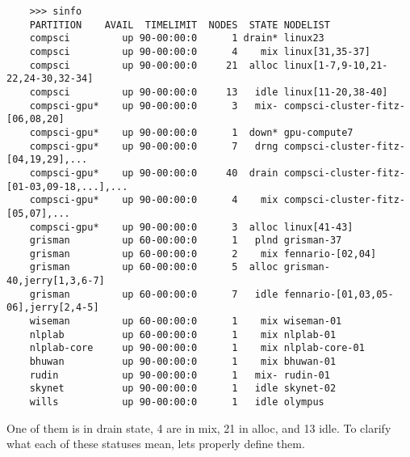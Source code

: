   \begin{lstlisting}
    >>> sinfo
    PARTITION    AVAIL  TIMELIMIT  NODES  STATE NODELIST
    compsci         up 90-00:00:0      1 drain* linux23
    compsci         up 90-00:00:0      4    mix linux[31,35-37]
    compsci         up 90-00:00:0     21  alloc linux[1-7,9-10,21-22,24-30,32-34]
    compsci         up 90-00:00:0     13   idle linux[11-20,38-40]
    compsci-gpu*    up 90-00:00:0      3   mix- compsci-cluster-fitz-[06,08,20]
    compsci-gpu*    up 90-00:00:0      1  down* gpu-compute7
    compsci-gpu*    up 90-00:00:0      7   drng compsci-cluster-fitz-[04,19,29],...
    compsci-gpu*    up 90-00:00:0     40  drain compsci-cluster-fitz-[01-03,09-18,...],...
    compsci-gpu*    up 90-00:00:0      4    mix compsci-cluster-fitz-[05,07],...
    compsci-gpu*    up 90-00:00:0      3  alloc linux[41-43]
    grisman         up 60-00:00:0      1   plnd grisman-37
    grisman         up 60-00:00:0      2    mix fennario-[02,04]
    grisman         up 60-00:00:0      5  alloc grisman-40,jerry[1,3,6-7]
    grisman         up 60-00:00:0      7   idle fennario-[01,03,05-06],jerry[2,4-5]
    wiseman         up 60-00:00:0      1    mix wiseman-01
    nlplab          up 60-00:00:0      1    mix nlplab-01
    nlplab-core     up 90-00:00:0      1    mix nlplab-core-01
    bhuwan          up 90-00:00:0      1    mix bhuwan-01
    rudin           up 90-00:00:0      1   mix- rudin-01
    skynet          up 90-00:00:0      1   idle skynet-02
    wills           up 90-00:00:0      1   idle olympus 
  \end{lstlisting}
  
  One of them is in drain state, 4 are in mix, 21 in alloc, and 13 idle. To clarify what each of these statuses mean, lets properly define them. 

